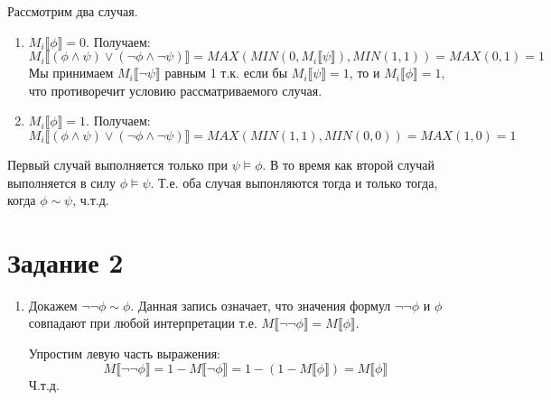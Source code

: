 \documentclass{article}
\begin{document}
\begin{enumerate}
          Рассмотрим два случая.
          \begin{enumerate}
              \item
                    \(M_i\llbracket \phi \rrbracket = 0\). Получаем:
                    \[
                        M_i\llbracket (\phi \land \psi) \lor (\neg \phi \land \neg \psi) \rrbracket
                        = MAX(MIN(0, M_i\llbracket\psi\rrbracket), MIN(1, 1))
                        = MAX(0, 1)
                        = 1
                    \]
                    Мы принимаем \(M_i\llbracket\neg\psi\rrbracket\) равным 1 т.к. если бы \(M_i\llbracket\psi\rrbracket = 1\), то и \(M_i\llbracket\phi\rrbracket = 1\), что противоречит условию рассматриваемого случая.
              \item
                    \(M_i\llbracket \phi \rrbracket = 1\). Получаем:
                    \[
                        M_i\llbracket (\phi \land \psi) \lor (\neg \phi \land \neg \psi) \rrbracket
                        = MAX(MIN(1, 1), MIN(0, 0))
                        = MAX(1, 0)
                        = 1
                    \]
          \end{enumerate}

          Первый случай выполняется только при \(\psi \models \phi\).
          В то время как второй случай выполняется в силу \(\phi \models \psi\).
          Т.е. оба случая выпонляются тогда и только тогда, когда \(\phi \sim \psi\), ч.т.д.
\end{enumerate}

\section*{Задание 2}
\begin{enumerate}
    \item
          Докажем \(\neg \neg \phi \sim \phi\). Данная запись означает, что значения формул \(\neg \neg \phi\) и \(\phi\) совпадают при любой интерпретации т.е. \(M\llbracket \neg \neg \phi\rrbracket = M\llbracket\phi\rrbracket\).

          Упростим левую часть выражения:
          \[
              M\llbracket\neg \neg \phi \rrbracket
              = 1 - M\llbracket \neg \phi \rrbracket
              = 1 - (1 - M\llbracket\phi\rrbracket)
              = M\llbracket\phi\rrbracket
          \]
          Ч.т.д.
\end{enumerate}
\end{document}
